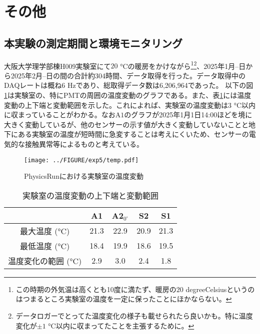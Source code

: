 \documentclass[../../main.tex]{subfiles}
\numberwithin{equation}{section}
\numberwithin{table}{section}
\numberwithin{figure}{section}
\begin{document}
\FloatBarrier
\section{その他}

\subsection{本実験の測定期間と環境モニタリング}\label{sec:exp5_run_period}
				大阪大学理学部棟H009実験室にて$20$ \si{\degreeCelsius}の暖房をかけながら\footnote{この時期の外気温は高くとも10度に満たず、暖房の$20$ \si{degreeCelsius}というのはつまるところ実験室の温度を一定に保ったことにほかならない。}\footnote{データロガーでとってた温度変化の様子も載せられたら良いかも。特に温度変化が$\pm1$ \si{\degreeCelsius}以内に収まってたことを主張するために。}、2025年1月--日から2025年2月--日の間の合計約304時間、データ取得を行った。データ取得中のDAQレートは概ね6 \si{\hertz}であり、総取得データ数は6,206,964であった。
				以下の図\ref{fig:temp}は実験室の、特にPMTの周囲の温度変動のグラフである。また、表\ref{table:temp}には温度変動の上下端と変動範囲を示した。これによれば、実験室の温度変動は3 \si{\degreeCelsius}以内に収まっていることがわかる。なお$\mathrm{A1}$のグラフが2025年1月1日14:00ほどを境に大きく変動しているが、他のセンサーの示す値が大きく変動していないことと地下にある実験室の温度が短時間に急変することは考えにくいため、センサーの電気的な接触異常等によるものと考えている。

				\begin{figure}[b]
					\centering
					\texttt{[image: ../FIGURE/exp5/temp.pdf]}
					\caption{PhysicsRunにおける実験室の温度変動}
					\label{fig:temp}
				\end{figure}


				\begin{table}[b]
					\centering
					\caption{実験室の温度変動の上下端と変動範囲}\label{table:temp}
					\begin{tabular}{c|cccc}
						& A1 & A2$_{0^{\circ}}$ & S2 & S1 \\ \hline
						最大温度 (\si{\degreeCelsius}) & 21.3 & 22.9 & 20.9 & 21.3 \\
						最低温度 (\si{\degreeCelsius}) & 18.4 & 19.9 & 18.6 & 19.5 \\
						温度変化の範囲 (\si{\degreeCelsius}) & 2.9 & 3.0 & 2.4 & 1.8 \\
					\end{tabular}
				\end{table}
\end{document}
